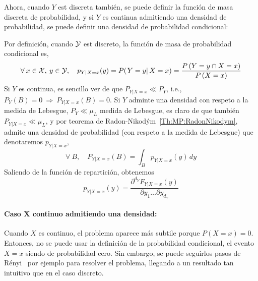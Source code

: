 {Ahora, cuando $Y$ est discreta tambi\'en,  se puede definir la funci\'on de masa
discreta  de probabilidad,  y  si $Y$  es  continua admitiendo  una densidad  de
probabilidad, se puede definir una densidad de probabilidad condicional:
%
\begin{definicion}
  Por  definici\'on,  cuando  $\mathcal{Y}$  est   discreto,  la  funci\'on  de  masa  de
  probabilidad condicional es,
  \[
  \forall \:  x \in  \mathcal{X}, \: y  \in \mathcal{Y}, \quad  p_{Y|X=x}(y) =  P( \left. Y  = y
  \right|  X =  x  ) =  \frac{P\left(Y  = y  \cap X  =  x \right)}{P\left(X  =
      x\right)}
  \]
  Si $Y$ es continua, es sencillo  ver de que $P_{Y|X=x} \ll P_Y$, i.e., $P_Y(B)
  = 0  \: \Rightarrow  \: P_{Y|X=x}(B) =  0$.  Si  $Y$ adminte una  densidad con
  respeto a la medida de Lebesgue,  $P_Y \ll \mu_L$ medida de Lebesgue, es claro
  de    que   tambi\'en   $P_{Y|X=x}    \ll   \mu_L$,    y   por    teorema   de
  Radon-Nikod\'ym~\ref{Th:MP:RadonNikodym}, admite  una densidad de probabilidad
  (con respeto a la medida de Lebesgue) que denotaremos $p_{Y|X=x}$,
  \[
  \forall \: B, \quad P_{Y|X=x}(B) = \int_B p_{Y|X=x}(y) \, dy
  \]
  Saliendo de la funci\'on de repartici\'on, obtenemos
  \[
  p_{Y|X=x}(y) = \frac{\partial^{d_Y} F_{Y|X=x}(y)}{\partial y_1 \ldots \partial
    y_{d_Y}}
  \]
\end{definicion}



\paragraph{Caso $\boldsymbol{X}$ continuo admitiendo una densidad:}
Cuando  $X$ es  continuo, el  problema aparece  m\'as subtile  porque  $P(X=x) =
0$. Entonces, no  se puede usar la definici\'on  de la probabilidad condicional,
el evento  $X=x$ siendo  de probabilidad cero.  Sin embargo, se  puede seguirlos
pasos  de  R\'enyi~\cite[Cap.~5]{Ren} por  ejemplo  para  resolver el  problema,
llegando a un resultado tan intuitivo que en el caso discreto.

}
